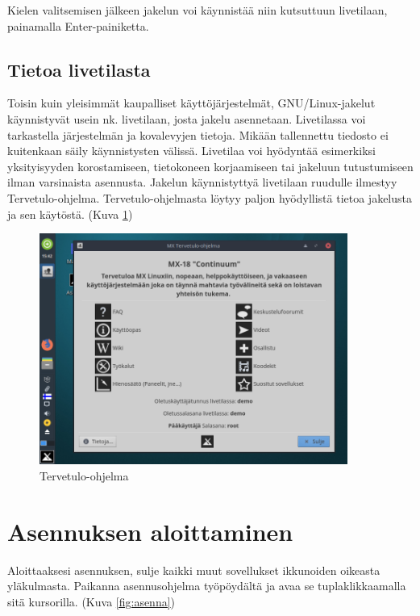 \documentclass[a4paper, 12pt, finnish]{article}
\begin{document}
Kielen valitsemisen jälkeen jakelun voi käynnistää niin kutsuttuun livetilaan, painamalla Enter-painiketta.

\subsection{Tietoa livetilasta}

Toisin kuin yleisimmät kaupalliset käyttöjärjestelmät, GNU/Linux-jakelut käynnistyvät usein nk. livetilaan, josta jakelu asennetaan.
Livetilassa voi tarkastella järjestelmän ja kovalevyjen tietoja. Mikään tallennettu tiedosto ei kuitenkaan säily käynnistysten välissä. Livetilaa voi hyödyntää esimerkiksi yksityisyyden korostamiseen, tietokoneen korjaamiseen tai jakeluun tutustumiseen ilman varsinaista asennusta. Jakelun käynnistyttyä livetilaan ruudulle ilmestyy Tervetulo-ohjelma.
Tervetulo-ohjelmasta löytyy paljon hyödyllistä tietoa jakelusta ja sen käytöstä. (Kuva \ref{fig:welcome})

\begin{figure}[htpb]
    \begin{center}
        \includegraphics[width=0.9\textwidth]{asen/welcome}
        \caption{Tervetulo-ohjelma}
        \label{fig:welcome}
    \end{center}
\end{figure}

\section{Asennuksen aloittaminen}

Aloittaaksesi asennuksen, sulje kaikki muut sovellukset ikkunoiden oikeasta yläkulmasta. Paikanna asennusohjelma työpöydältä ja avaa se tuplaklikkaamalla sitä kursorilla. (Kuva \ref{fig:asenna})
\end{document}
